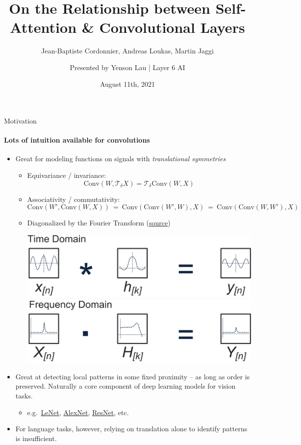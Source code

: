 \documentclass[9pt]{beamer}
\title{On the Relationship between Self-Attention \& Convolutional Layers}
\subtitle{
    Jean-Baptiste Cordonnier, Andreas Loukas, Martin Jaggi
}
\author{
    Presented by Yenson Lau | Layer 6 AI
}
\date{August 11th, 2021}
\newcommand{\eq}{\ =\ }
\newcommand{\mc}{\mathcal}
\begin{document}
\maketitle


\begin{frame}{Motivation}
\framesubtitle{Lots of intuition available for convolutions}
\begin{itemize} \setlength\itemsep{1.2em}
\item Great for modeling functions on signals with {\em translational symmetries}

\begin{itemize} \setlength\itemsep{1em}
    \item Equivariance / invariance: 
    $$\textrm{Conv}(W, \mc T_{\delta} X) = \mc T_{\delta} \textrm{Conv}(W, X)$$
    
    \item Associativity / commutativity:
    \begin{equation*}
        \textrm{Conv}(W', \textrm{Conv}(W, X)) 
            \eq \textrm{Conv}(\textrm{Conv}(W', W), X)
            \eq \textrm{Conv}(\textrm{Conv}(W, W'), X) 
    \end{equation*}

    \item Diagonalized by the Fourier Transform
    (\href{http://hamiltonkibbe.com/finite-impulse-response-filters-using-apples-accelerate-framework-part-iii/}{source})
    \begin{center}
        \includegraphics[width=.4\textwidth]{presentation/images/conv-time.png}
        \qquad
        \includegraphics[width=.4\textwidth]{presentation/images/conv-freq.png}
    \end{center}
\end{itemize}

\item Great at detecting local patterns in some fixed proximity -- as long as order is preserved. Naturally a core component of deep learning models for vision tasks.
\begin{itemize}
    \item e.g.\ 
    \href{http://yann.lecun.com/exdb/lenet/}{LeNet}, 
    \href{https://papers.nips.cc/paper/2012/file/c399862d3b9d6b76c8436e924a68c45b-Paper.pdf}{AlexNet}, 
    \href{https://arxiv.org/abs/1512.03385}{ResNet}, etc.
\end{itemize}

\item For language tasks, however, relying on translation alone to identify patterns is insufficient.
\end{itemize}
\end{frame}
\end{document}
